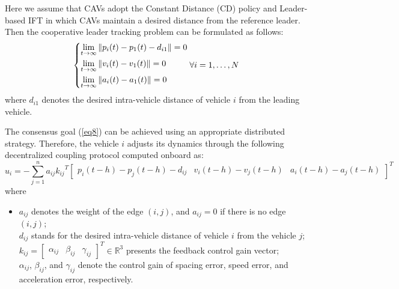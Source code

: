 \documentclass[a4paper]{cas-sc}
\begin{document}
Here we assume that CAVs adopt the Constant Distance (CD) policy and Leader-based IFT in which CAVs maintain a desired distance from the reference leader. Then the cooperative leader tracking problem can be formulated as follows:
\begin{equation}
  \left\{ \begin{gathered}
    \mathop {\lim }\limits_{t \to \infty } \left\| {{p_i}(t) - {p_1}(t) - {d_{i1}}} \right\| = 0 \hfill \\
    \mathop {\lim }\limits_{t \to \infty } \left\| {{v_i}(t) - {v_1}(t)} \right\| = 0 \hfill \\
    \mathop {\lim }\limits_{t \to \infty } \left\| {{a_i}(t) - {a_1}(t)} \right\| = 0 \hfill \\
  \end{gathered}  \right.\forall i = 1, \ldots ,N
  \label{eq8}
\end{equation}
where $d_{i1}$ denotes the desired intra-vehicle distance of vehicle $i$ from the leading vehicle.

The consensus goal (\ref{eq8}) can be achieved using an appropriate distributed strategy. Therefore, the vehicle $i$ adjusts its dynamics through the following decentralized coupling protocol computed onboard as:
\begin{equation}
  {u_i} =  - \sum\limits_{j = 1}^n {{a_{ij}}{k_{ij}}^T{{\left[ {\begin{array}{*{20}{c}}
              {{p_i}\left( {t - {h}} \right) - {p_j}\left( {t - {h}} \right) - {d_{ij}}} & {{v_i}\left( {t - {h}} \right) - {v_j}\left( {t - {h}} \right)} & {{a_i}\left( {t - {h}} \right) - {a_j}\left( {t - {h}} \right)}
            \end{array}} \right]}^T}}
  \label{eq9}
\end{equation}
where
\begin{itemize}
  \item[]
    ${a_{ij}}$ denotes the weight of the edge $\left( {i,j} \right)$, and ${a_{ij}} = 0$ if there is no edge $\left( {i,j} \right)$;                     \\
    ${d_{ij}}$ stands for the desired intra-vehicle distance of vehicle $i$ from the vehicle $j$;                                                        \\
    ${k_{ij}} = {\left[ {\begin{array}{*{20}{c}}
              {{\alpha _{ij}}} & {{\beta _{ij}}} & {{\gamma _{ij}}}
            \end{array}} \right]^T} \in {\mathbb{R}^{3}}$ presents the feedback control gain vector;                         \\
    ${\alpha _{ij}}$, ${\beta _{ij}}$, and ${\gamma _{ij}}$ denote the control gain of spacing error, speed error, and acceleration error, respectively.
\end{itemize}
\end{document}
